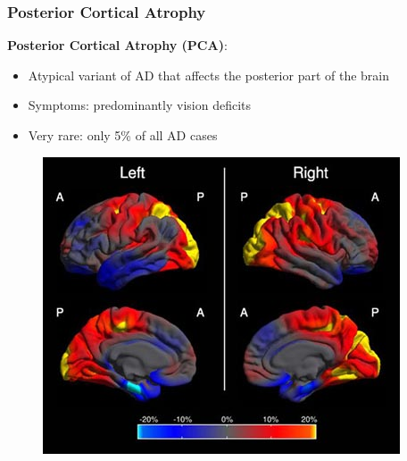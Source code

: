 \documentclass[10pt,xcolor=table]{beamer}
\begin{document}
\begin{frame}
\frametitle{Posterior Cortical Atrophy}

\textbf{Posterior Cortical Atrophy (PCA)}:
\begin{itemize}
 \item Atypical variant of AD that affects the posterior part of the brain
 \item Symptoms: predominantly vision deficits
 \item Very rare: only 5\% of all AD cases 
\end{itemize}

\vspace{1em}
\begin{figure}
\centering 
\includegraphics[scale=0.5]{PCAimageStory.jpg}
\end{figure}


\end{frame}


\end{document}
